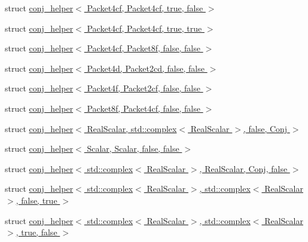 \begin{DoxyCompactItemize}
\item 
struct \hyperlink{struct_eigen_1_1internal_1_1conj__helper_3_01_packet4cf_00_01_packet4cf_00_01true_00_01false_01_4}{conj\+\_\+helper$<$ Packet4cf, Packet4cf, true, false $>$}
\item 
struct \hyperlink{struct_eigen_1_1internal_1_1conj__helper_3_01_packet4cf_00_01_packet4cf_00_01true_00_01true_01_4}{conj\+\_\+helper$<$ Packet4cf, Packet4cf, true, true $>$}
\item 
struct \hyperlink{struct_eigen_1_1internal_1_1conj__helper_3_01_packet4cf_00_01_packet8f_00_01false_00_01false_01_4}{conj\+\_\+helper$<$ Packet4cf, Packet8f, false, false $>$}
\item 
struct \hyperlink{struct_eigen_1_1internal_1_1conj__helper_3_01_packet4d_00_01_packet2cd_00_01false_00_01false_01_4}{conj\+\_\+helper$<$ Packet4d, Packet2cd, false, false $>$}
\item 
struct \hyperlink{struct_eigen_1_1internal_1_1conj__helper_3_01_packet4f_00_01_packet2cf_00_01false_00_01false_01_4}{conj\+\_\+helper$<$ Packet4f, Packet2cf, false, false $>$}
\item 
struct \hyperlink{struct_eigen_1_1internal_1_1conj__helper_3_01_packet8f_00_01_packet4cf_00_01false_00_01false_01_4}{conj\+\_\+helper$<$ Packet8f, Packet4cf, false, false $>$}
\item 
struct \hyperlink{struct_eigen_1_1internal_1_1conj__helper_3_01_real_scalar_00_01std_1_1complex_3_01_real_scalar_01_4_00_01false_00_01_conj_01_4}{conj\+\_\+helper$<$ Real\+Scalar, std\+::complex$<$ Real\+Scalar $>$, false, Conj $>$}
\item 
struct \hyperlink{struct_eigen_1_1internal_1_1conj__helper_3_01_scalar_00_01_scalar_00_01false_00_01false_01_4}{conj\+\_\+helper$<$ Scalar, Scalar, false, false $>$}
\item 
struct \hyperlink{struct_eigen_1_1internal_1_1conj__helper_3_01std_1_1complex_3_01_real_scalar_01_4_00_01_real_scalar_00_01_conj_00_01false_01_4}{conj\+\_\+helper$<$ std\+::complex$<$ Real\+Scalar $>$, Real\+Scalar, Conj, false $>$}
\item 
struct \hyperlink{struct_eigen_1_1internal_1_1conj__helper_3_01std_1_1complex_3_01_real_scalar_01_4_00_01std_1_1co17cad1c9f1dd5f8fd2568a2fb541b29b}{conj\+\_\+helper$<$ std\+::complex$<$ Real\+Scalar $>$, std\+::complex$<$ Real\+Scalar $>$, false, true $>$}
\item 
struct \hyperlink{struct_eigen_1_1internal_1_1conj__helper_3_01std_1_1complex_3_01_real_scalar_01_4_00_01std_1_1coc8c8eb305908066796b4a168e94f9c59}{conj\+\_\+helper$<$ std\+::complex$<$ Real\+Scalar $>$, std\+::complex$<$ Real\+Scalar $>$, true, false $>$}

\end{DoxyCompactItemize}
